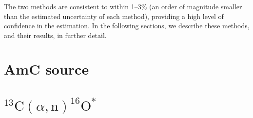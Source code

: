 \documentclass[../thesis.tex]{subfiles}
\begin{document}
The two methods are consistent to within 1--3\% (an order of magnitude smaller than the estimated uncertainty of each method), providing a high level of confidence in the estimation. In the following sections, we describe these methods, and their results, in further detail.

\section{AmC source}

\section{$^{13}\mathrm{C}(\alpha, \mathrm{n})^{16}\mathrm{O}^*$}
\end{document}
